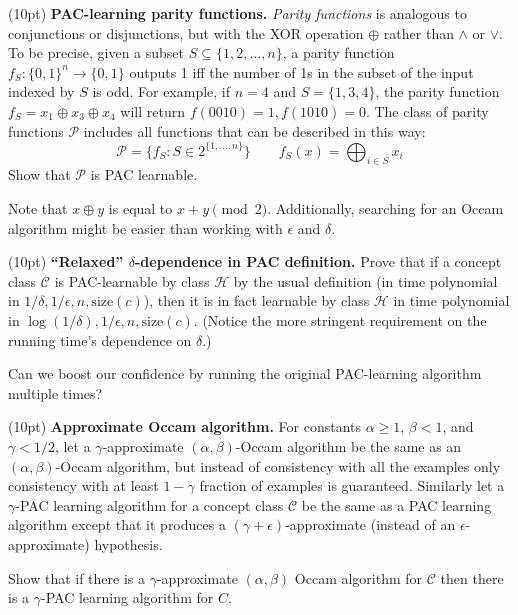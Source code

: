 \documentclass[11pt]{article}
\newcommand*{\C}{{\mathcal C}}
\newcommand*{\Hp}{{\mathcal H}}
\DeclareMathOperator{\1}{\mathbbm{1}}
\begin{document}
\begin{problem} (10pt) \textbf{PAC-learning parity functions.}
	\emph{Parity functions} is analogous to conjunctions or disjunctions, but with the XOR operation $\oplus$ rather than $\wedge$ or $\vee$. To be precise, given a subset $S \subseteq \{1, 2, \dots, n\}$, a parity function $f_S: \{0,1\}^n \to \{0,1\}$ outputs 1 iff the number of 1s in the subset of the input indexed by $S$ is odd. For example, if $n = 4$ and $S = \{1,3,4\}$, the parity function $f_S = x_1 \oplus x_3 \oplus x_4$ will return $f(0010) = 1, f(1010) = 0$. The class of parity functions $\mathcal{P}$ includes all functions that can be described in this way:
	\[ \mathcal{P} = \{f_S: S \in 2^{\{1,\dots,n\}}\} \qquad
	f_S(x) = \bigoplus_{i \in S}x_i \]
	Show that $\mathcal{P}$ is PAC learnable.
\end{problem}
\begin{hint}
	Note that $x \oplus y$ is equal to $x + y \pmod 2$. Additionally, searching for an Occam algorithm might be easier than working with $\epsilon$ and $\delta$.
\end{hint}




\begin{problem} (10pt) \textbf{``Relaxed'' $\delta$-dependence in PAC definition.}
Prove that if a concept class $\C$ is PAC-learnable by class $\Hp$ by the usual definition (in time polynomial in $1/\delta, 1/\epsilon, n, \text{size}(c)$), then it is in fact learnable by class $\Hp$ in time polynomial in $\log(1/\delta), 1/\epsilon, n, \text{size}(c)$. (Notice the more stringent requirement on the
running time's dependence on $\delta$.)
\end{problem}
\begin{hint}
	Can we boost our confidence by running the original PAC-learning algorithm multiple times?
\end{hint}



\begin{problem} (10pt) \textbf{Approximate Occam algorithm.}
For constants $\alpha \geq 1$, $\beta <1$, and $\gamma
<1/2$, let a $\gamma$-approximate $(\alpha,\beta)$-Occam algorithm be the same
as an $(\alpha,\beta)$-Occam algorithm, but instead of consistency with all the
examples only consistency with at least $1-\gamma$ fraction of examples is
guaranteed. Similarly let a $\gamma$-PAC learning algorithm for a concept class
$\C$ be the same as a PAC learning algorithm except that it produces a
$(\gamma+\epsilon)$-approximate (instead of an $\epsilon$-approximate)
hypothesis.

Show that if there is a $\gamma$-approximate $(\alpha,\beta)$ Occam
algorithm for $\C$ then there is a $\gamma$-PAC learning algorithm for $C$.
\end{problem}
\end{document}
